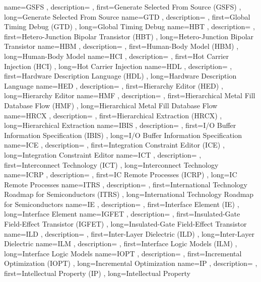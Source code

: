 { name={GSFS}
, description={}
, first={Generate Selected From Source (GSFS)}
, long={Generate Selected From Source}
}
{ name={GTD}
, description={}
, first={Global Timing Debug (GTD)}
, long={Global Timing Debug}
}
{ name={HBT}
, description={}
, first={Hetero-Junction Bipolar Transistor (HBT)}
, long={Hetero-Junction Bipolar Transistor}
}
{ name={HBM}
, description={}
, first={Human-Body Model (HBM)}
, long={Human-Body Model}
}
{ name={HCI}
, description={}
, first={Hot Carrier Injection (HCI)}
, long={Hot Carrier Injection}
}
{ name={HDL}
, description={}
, first={Hardware Description Language (HDL)}
, long={Hardware Description Language}
}
{ name={HED}
, description={}
, first={Hierarchy Editor (HED)}
, long={Hierarchy Editor}
}
{ name={HMF}
, description={}
, first={Hierarchical Metal Fill Database Flow (HMF)}
, long={Hierarchical Metal Fill Database Flow}
}
{ name={HRCX}
, description={}
, first={Hierarchical Extraction (HRCX)}
, long={Hierarchical Extraction}
}
{ name={IBIS}
, description={}
, first={I/O Buffer Information Specification (IBIS)}
, long={I/O Buffer Information Specification}
}
{ name={ICE}
, description={}
, first={Integration Constraint Editor (ICE)}
, long={Integration Constraint Editor}
}
{ name={ICT}
, description={}
, first={Interconnect Technology (ICT)}
, long={Interconnect Technology}
}
{ name={ICRP}
, description={}
, first={IC Remote Processes (ICRP)}
, long={IC Remote Processes}
}
{ name={ITRS}
, description={}
, first={International Technology Roadmap for Semiconductors (ITRS)}
, long={International Technology Roadmap for Semiconductors}
}
{ name={IE}
, description={}
, first={Interface Element (IE)}
, long={Interface Element}
}
{ name={IGFET}
, description={}
, first={Insulated-Gate Field-Effect Transistor (IGFET)}
, long={Insulated-Gate Field-Effect Transistor}
}
{ name={ILD}
, description={}
, first={Inter-Layer Dielectric (ILD)}
, long={Inter-Layer Dielectric}
}
{ name={ILM}
, description={}
, first={Interface Logic Models (ILM)}
, long={Interface Logic Models}
}
{ name={IOPT}
, description={}
, first={Incremental Optimization (IOPT)}
, long={Incremental Optimization}
}
{ name={IP}
, description={}
, first={Intellectual Property (IP)}
, long={Intellectual Property}
}
